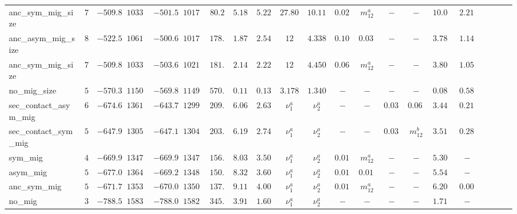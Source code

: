 \begin{landscape}
\begin{table}
{\begin{tabular}{lcccccccccccccccccccc}
anc\_sym\_mig\_size & $7$ & $-509.8$ & $1033.6$ & $\mathbf{-501.5}$ & $1017.1$ & %
$80.2 $ & $5.182$ & $5.228$ & $27.808$ & $10.110$ & $0.028$ & $m_{12}^a$ & $-$ & $-$ & $10.000$ & $2.218$\\

anc\_asym\_mig\_size & $8$ & $-522.5$ & $1061.0$ & $\mathbf{-500.6}$ & $1017.2$ & %
$178.2$ & $ 1.873$ & $2.543$ & $12$ & $4.338$ & $0.100$ & $0.039$ & $-$ & $-$ & $3.780$ & $1.145$\\

anc\_sym\_mig\_size & $7$ & $-509.8$ & $1033.6$ & $\mathbf{-503.6}$ & $1021.3$ & %
$181.2$ & $ 2.145$ & $2.220$ & $12$ & $4.450$ & $0.068$ & $m_{12}^a$ & $-$ & $-$ & $3.806$ & $1.051$\\

no\_mig\_size & $5$ & $-570.3$ & $1150.6$ & $\mathbf{-569.8}$ & $1149.7$ & %
$570.1$ & $0.115$ & $0.139$ & $3.178$ & $1.340$ & $-$ & $-$ & $-$ & $-$ & $0.085$ & $0.588$\\

sec\_contact\_asym\_mig & $6$ & $-674.6$ & $1361.2$ & $\mathbf{-643.7}$ & $1299.5$ & %
$209.4$ & $6.061$ & $2.631$ & $\nu_1^a$ & $\nu_2^a$ & $-$ & $-$ & $0.036$ & $0.063$ & $3.441$ & $0.218$\\

sec\_contact\_sym\_mig & $5$ & $-647.9$ & $1305.8$ & $\mathbf{-647.1}$ & $1304.3$ & %
$203.4$ & $6.197$ & $2.745$ & $\nu_1^a$ & $\nu_2^a$ & $-$ & $-$ & $0.037$ & $m_{12}^b$ & $3.514$ & $0.286$\\

sym\_mig & $4$ & $-669.9$ & $1347.8$ & $-669.9$ & $1347.9$ & %
$156.2$ & $8.036$ & $3.509$ & $\nu_1^a$ & $\nu_2^a$ & $0.012$ & $m_{12}^a$ & $-$ & $-$ & $5.306$ & $-$\\

asym\_mig & $5$ & $-677.0$ & $1364.0$ & $\mathbf{-669.2}$ & $1348.5$ & %
$150.9$ & $8.321$ & $3.609$ & $\nu_1^a$ & $\nu_2^a$ & $0.011$ & $0.014$ & $-$ & $-$ & $5.543$ & $-$\\

anc\_sym\_mig & $5$ & $-671.7$ & $1353.4$ & $\mathbf{-670.0}$ & $1350.0$ & %
$137.1$ & $9.111$ & $4.000$ & $\nu_1^a$ & $\nu_2^a$ & $0.011$ & $m_{12}^a$ & $-$ & $-$ & $6.202$ & $0.000$\\

no\_mig & $3$ & $-788.5$ & $1583.0$ & $\mathbf{-788.0}$ & $1582.0$ & %
$345.1$ & $3.911$ & $1.607 $ & $\nu_1^a$ & $\nu_2^a$ & $-$ & $-$ & $-$ & $-$ & $1.716$ & $-$\\


\end{tabular}}
\end{table}
\end{landscape}
